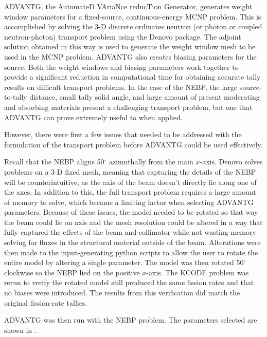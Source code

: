 ADVANTG, the AutomateD VAriaNce reducTion Generator, generates weight window parameters for a fixed-source, continuous-energy MCNP problem.
This is accomplished by solving the 3-D discrete ordinates neutron (or photon or coupled neutron-photon) transport problem using the Denovo package.
The adjoint solution obtained in this way is used to generate the weight window mesh to be used in the MCNP problem.
ADVANTG also creates biasing parameters for the source.
Both the weight windows and biasing parameters work together to provide a significant reduction in computational time for obtaining accurate tally results on difficult transport problems.
In the case of the NEBP, the large source-to-tally distance, small tally solid angle, and large amount of present moderating and absorbing materials present a challenging transport problem, but one that ADVANTG can prove extremely useful to when applied.

However, there were first a few issues that needed to be addressed with the formulation of the transport problem before ADVANTG could be used effectively.

Recall that the NEBP aligns 50$^{\circ}$ azimuthally from the main $x$-axis.
Denovo solves problems on a 3-D fixed mesh, meaning that capturing the details of the NEBP will be counterintuitive, as the axis of the beam doesn't directly lie along one of the axes.
In addition to this, the full transport problem requires a large amount of memory to solve, which became a limiting factor when selecting ADVANTG parameters.
Because of these issues, the model needed to be rotated so that way the beam could lie on axis and the mesh resolution could be altered in a way that fully captured the effects of the beam and collimator while not wasting memory solving for fluxes in the structural material outside of the beam.
Alterations were then made to the input-generating python scripts to allow the user to rotate the entire model by altering a single parameter.
The model was then rotated 50$^{\circ}$ clockwise so the NEBP lied on the positive $x$-axis.
The KCODE problem was rerun to verify the rotated model still produced the same fission rates and that no biases were introduced.
The results from this verification did match the original fission-rate tallies.

ADVANTG was then run with the NEBP problem.
The parameters selected are shown in .


